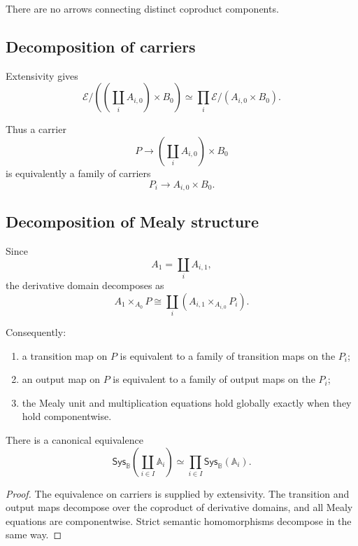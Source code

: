 There are no arrows connecting distinct coproduct components.

\subsection{Decomposition of carriers}
\label{subsec:decomposition-carriers}

Extensivity gives
\[
    \mathcal E/
    \left(
    \left(\coprod_iA_{i,0}\right)\times B_0
    \right)
    \simeq
    \prod_i
    \mathcal E/(A_{i,0}\times B_0).
\]

Thus a carrier
\[
    P\to
    \left(\coprod_iA_{i,0}\right)\times B_0
\]
is equivalently a family of carriers
\[
    P_i\to A_{i,0}\times B_0.
\]

\subsection{Decomposition of Mealy structure}
\label{subsec:decomposition-mealy-structure}

Since
\[
    A_1=\coprod_iA_{i,1},
\]
the derivative domain decomposes as
\[
    A_1\times_{A_0}P
    \cong
    \coprod_i
    \left(
    A_{i,1}\times_{A_{i,0}}P_i
    \right).
\]

Consequently:
\begin{enumerate}
    \item a transition map on \(P\) is equivalent to a family of transition
    maps on the \(P_i\);
    \item an output map on \(P\) is equivalent to a family of output maps on
    the \(P_i\);
    \item the Mealy unit and multiplication equations hold globally exactly
    when they hold componentwise.
\end{enumerate}

\begin{theorem}
\label{thm:extensive-descent-systems}
There is a canonical equivalence
\[
    \mathsf{Sys}_{\mathbb B}
    \left(
    \coprod_{i\in I}\mathbb A_i
    \right)
    \simeq
    \prod_{i\in I}
    \mathsf{Sys}_{\mathbb B}(\mathbb A_i).
\]
\end{theorem}

\begin{proof}
The equivalence on carriers is supplied by extensivity. The transition and
output maps decompose over the coproduct of derivative domains, and all Mealy
equations are componentwise. Strict semantic homomorphisms decompose in the
same way.
\end{proof}

